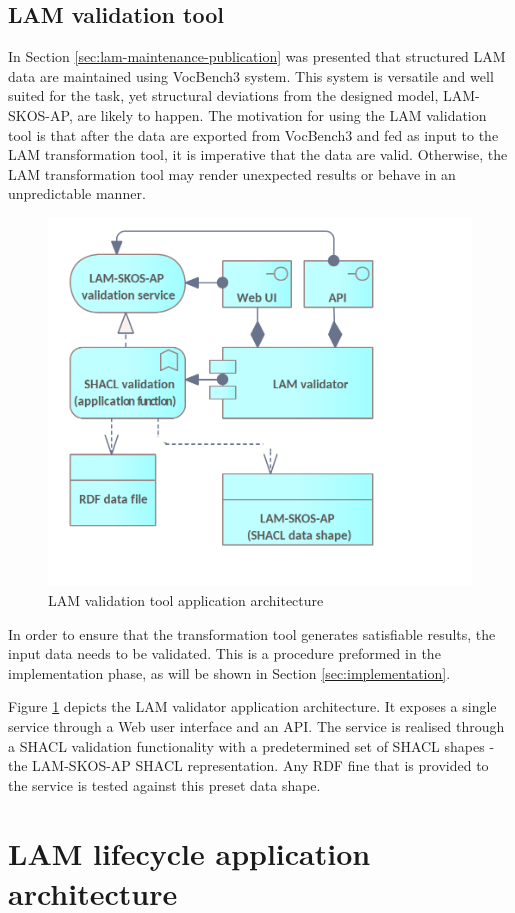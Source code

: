 	\subsection{LAM validation tool}
	
	In Section \ref{sec:lam-maintenance-publication} was presented that structured LAM data are maintained using VocBench3 system. This system is versatile and well suited for the task, yet structural deviations from the designed model, LAM-SKOS-AP, are likely to happen. 
	The motivation for using the LAM validation tool is that after the data are exported from VocBench3 and fed as input to the LAM transformation tool, it is imperative that the data are valid. Otherwise, the LAM transformation tool may render unexpected results or behave in an unpredictable manner. 
	
 	\begin{figure}[!h]
		\centering
		\includegraphics[width=.517\textwidth]{images/application/LAM Validator.png}
		\caption{LAM validation tool application architecture}
		\label{fig:app-lam-validator}
	\end{figure}

	In order to ensure that the transformation tool generates satisfiable results, the input data needs to be validated. This is a procedure preformed in the implementation phase, as will be shown in Section \ref{sec:implementation}. 
	
	Figure \ref{fig:app-lam-validator} depicts the LAM validator application architecture. It exposes a single service through a Web user interface and an API. The service is realised through a SHACL \citep{shacl-spec} validation functionality with a predetermined set of SHACL shapes - the LAM-SKOS-AP\citep{lam-skos-ap-2019} SHACL representation. Any RDF fine that is provided to the service is tested against this preset data shape. 

	\section{LAM lifecycle application architecture}
	\label{sec:application-lifecycle}
	
